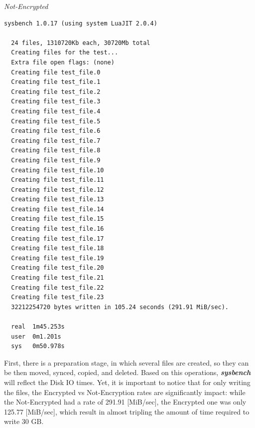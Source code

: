 \noindent\begin{minipage}[t]{0.45\linewidth}
  \centering
  \textit{Not-Encrypted}
  \begin{lstlisting}[basicstyle=\tiny,frame=single, label=cpu_test2]
  sysbench 1.0.17 (using system LuaJIT 2.0.4)

  24 files, 1310720Kb each, 30720Mb total
  Creating files for the test...
  Extra file open flags: (none)
  Creating file test_file.0
  Creating file test_file.1
  Creating file test_file.2
  Creating file test_file.3
  Creating file test_file.4
  Creating file test_file.5
  Creating file test_file.6
  Creating file test_file.7
  Creating file test_file.8
  Creating file test_file.9
  Creating file test_file.10
  Creating file test_file.11
  Creating file test_file.12
  Creating file test_file.13
  Creating file test_file.14
  Creating file test_file.15
  Creating file test_file.16
  Creating file test_file.17
  Creating file test_file.18
  Creating file test_file.19
  Creating file test_file.20
  Creating file test_file.21
  Creating file test_file.22
  Creating file test_file.23
  32212254720 bytes written in 105.24 seconds (291.91 MiB/sec).
  
  real	1m45.253s
  user	0m1.201s
  sys	0m50.978s
  \end{lstlisting}
\end{minipage}

First, there is a preparation stage, in which several files are created, so they can be then moved, synced, copied, and deleted. Based on this operations, \textbf{\textit{sysbench}} will reflect the Disk IO times.
Yet, it is important to notice that for only writing the files, the Encrypted vs Not-Encryption rates are significantly impact: while the Not-Encrypted had a rate of 291.91 [MiB/sec], the Encrypted one was only 125.77 [MiB/sec], which result in almost tripling the amount of time required to write 30 GB.

